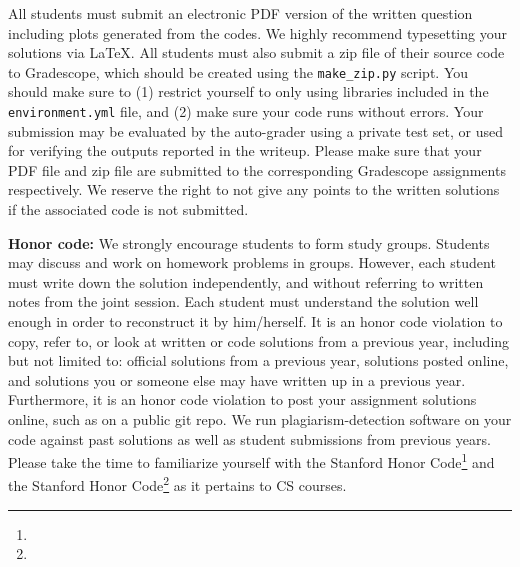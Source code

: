 All students must submit an electronic PDF version of the written question including plots generated from the codes. We
highly recommend typesetting your solutions via \LaTeX. 
All students must also submit a zip file of
their source code to Gradescope, which should be created using the
\texttt{make\_zip.py} script. You
should make sure to (1) restrict yourself to only using libraries included in
the
\texttt{environment.yml} file, and (2) make sure your code runs without errors.
Your submission may be evaluated by the
auto-grader using a private test set, or used for verifying the outputs reported in the writeup. Please make sure that your PDF file and zip file are submitted to the corresponding Gradescope assignments respectively. We reserve the right to not give any points to the written solutions if the associated code is not submitted.

\vspace{0.1in}
{\bf Honor code:} 
We strongly encourage students to form study groups. Students may discuss and work on homework problems in groups. However, each student must write down the solution independently, and without referring to written notes from the joint session. Each student must understand the solution well enough in order to reconstruct it by him/herself. It is an honor code violation to copy, refer to, or look at written or code solutions from a previous year, including but not limited to: official solutions from a previous year, solutions posted online, and solutions you or someone else may have written up in a previous year. Furthermore, it is an honor code violation to post your assignment solutions online, such as on a public git repo. We run plagiarism-detection software on your code against past solutions as well as student submissions from previous years. Please take the time to familiarize yourself with the Stanford Honor Code\footnote{} and the Stanford Honor Code\footnote{} as it pertains to CS courses.
